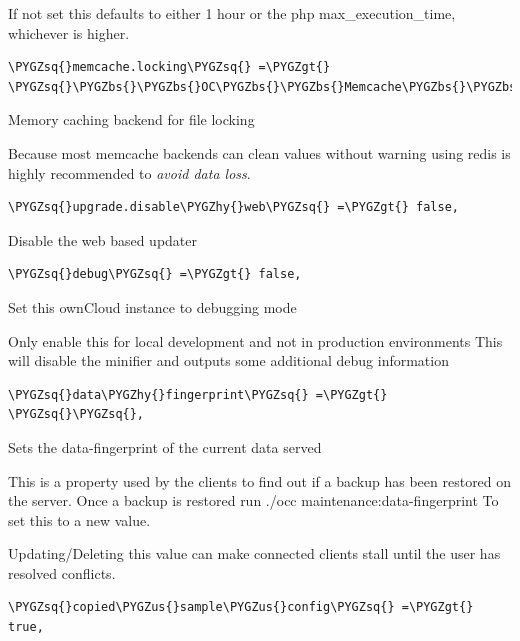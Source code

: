 \documentclass[letterpaper,10pt,english]{sphinxmanual}
\def\PYGZbs{\char`\\}
\def\PYGZus{\char`\_}
\def\PYGZgt{\char`\>}
\def\PYGZhy{\char`\-}
\def\PYGZsq{\char`\'}
\begin{document}
If not set this defaults to either 1 hour or the php max\_execution\_time, whichever is higher.

\begin{Verbatim}[commandchars=\\\{\}]
\PYGZsq{}memcache.locking\PYGZsq{} =\PYGZgt{} \PYGZsq{}\PYGZbs{}\PYGZbs{}OC\PYGZbs{}\PYGZbs{}Memcache\PYGZbs{}\PYGZbs{}Redis\PYGZsq{},
\end{Verbatim}

Memory caching backend for file locking

Because most memcache backends can clean values without warning using redis
is highly recommended to \emph{avoid data loss}.

\begin{Verbatim}[commandchars=\\\{\}]
\PYGZsq{}upgrade.disable\PYGZhy{}web\PYGZsq{} =\PYGZgt{} false,
\end{Verbatim}

Disable the web based updater

\begin{Verbatim}[commandchars=\\\{\}]
\PYGZsq{}debug\PYGZsq{} =\PYGZgt{} false,
\end{Verbatim}

Set this ownCloud instance to debugging mode

Only enable this for local development and not in production environments
This will disable the minifier and outputs some additional debug information

\begin{Verbatim}[commandchars=\\\{\}]
\PYGZsq{}data\PYGZhy{}fingerprint\PYGZsq{} =\PYGZgt{} \PYGZsq{}\PYGZsq{},
\end{Verbatim}

Sets the data-fingerprint of the current data served

This is a property used by the clients to find out if a backup has been
restored on the server. Once a backup is restored run
./occ maintenance:data-fingerprint
To set this to a new value.

Updating/Deleting this value can make connected clients stall until
the user has resolved conflicts.

\begin{Verbatim}[commandchars=\\\{\}]
\PYGZsq{}copied\PYGZus{}sample\PYGZus{}config\PYGZsq{} =\PYGZgt{} true,
\end{Verbatim}
\end{document}
